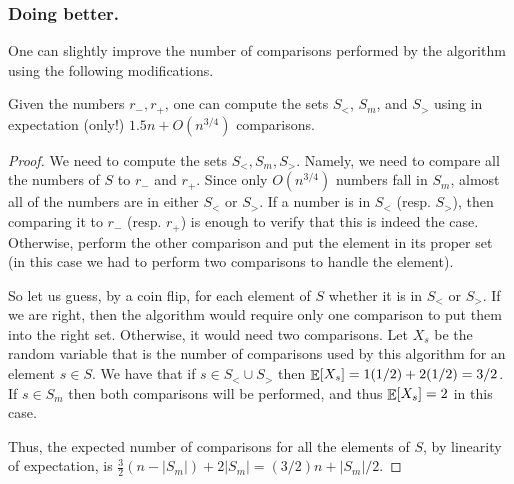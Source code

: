 \subsubsection{Doing better.}

One can slightly improve the number of comparisons performed by the
algorithm using the following modifications.
\begin{lemma}
    Given the numbers $r_{-}, r_{+}$, one can compute the sets
    $S_<$, $S_m$, and $S_>$ using in expectation (only!)
    $1.5n + O(n^{3/4})$ comparisons.
\end{lemma}
\begin{proof}
    We need to compute the sets $S_{<}, S_m, S_>$. Namely, we need to
    compare all the numbers of $S$ to $r_{-}$ and $r_{+}$. Since only
    $O(n^{3/4})$ numbers fall in $S_m$, almost all of the numbers are in
    either $S_<$ or $S_>$. If a number is in $S_<$ (resp. $S_>$), then
    comparing it to $r_-$ (resp. $r_+$) is enough to verify that this is
    indeed the case. Otherwise, perform the other comparison and put the
    element in its proper set (in this case we had to perform two
    comparisons to handle the element).

    So let us guess, by a coin flip, for each element of $S$ whether it
    is in $S_<$ or $S_>$. If we are right, then the algorithm would
    require only one comparison to put them into the right
    set. Otherwise, it would need two comparisons. Let $X_s$ be the
    random variable that is the number of comparisons used by this
    algorithm for an element $s \in S$. We have that if
    $s \in S_< \cup S_>$ then $\mathop{\mathbb{E}}\!\left[ {X_s} \right] = 1(1/2) + 2(1/2) = 3/2$. If
    $s \in S_m$ then both comparisons will be performed, and thus
    $\mathop{\mathbb{E}}\!\left[ {X_s} \right]=2$ in this case.

    Thus, the expected number of comparisons for all the elements of $S$,
    by linearity of expectation, is
    $\tfrac{3}{2}(n-|S_m|) + 2 |S_m| = (3/2)n + |S_m|/2$.
\end{proof}

